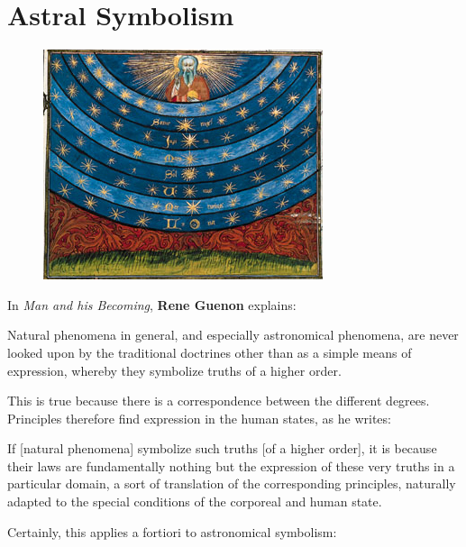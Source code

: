 \section{Astral Symbolism}

\begin{figure}
 \includegraphics[scale=1.5]{a20220215AstralSymbolism-img001.jpg} 
\end{figure}

In \emph{Man and his Becoming}, \textbf{Rene Guenon} explains:

\begin{quotex}
Natural phenomena in general, and especially astronomical phenomena, are never looked upon by the traditional doctrines other than as a simple means of expression, whereby they symbolize truths of a higher order.

\end{quotex}
This is true because there is a correspondence between the different degrees. Principles therefore find expression in the human states, as he writes:

\begin{quotex}
If [natural phenomena] symbolize such truths [of a higher order], it is because their laws are fundamentally nothing but the expression of these very truths in a particular domain, a sort of translation of the corresponding principles, naturally adapted to the special conditions of the corporeal and human state.

\end{quotex}
Certainly, this applies a fortiori to astronomical symbolism:

